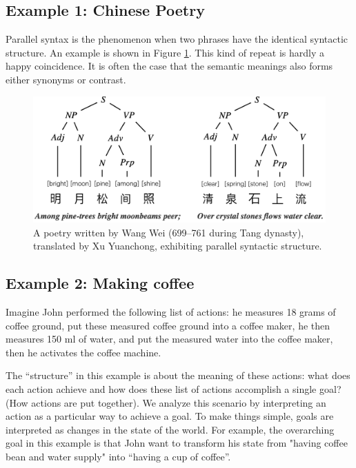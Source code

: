 \subsection{Example 1: Chinese Poetry}
Parallel syntax is the phenomenon when two phrases have the identical syntactic structure. An example is shown in Figure \ref{fig: Chinese poem}. This kind of repeat is hardly a happy coincidence. It is often the case that the semantic meanings also forms either synonyms or contrast. 
\begin{figure}
    \centering 
    \includegraphics[width=0.8\linewidth]{Chinese poem.png}
    \caption{A poetry written by Wang Wei (699–761 during Tang dynasty), translated by Xu Yuanchong, exhibiting parallel syntactic structure.} 
    \label{fig: Chinese poem}
\end{figure}

\subsection{Example 2: Making coffee}
Imagine John performed the following list of actions: he measures 18 grams of coffee ground, put these measured coffee ground into a coffee maker, he then measures 150 ml of water, and put the measured water into the coffee maker, then he activates the coffee machine. 


The ``structure'' in this example is about the meaning of these actions: what does each action achieve and how does these list of actions accomplish a single goal? (How actions are put together). 
We analyze this scenario by interpreting an action as a particular way to achieve a goal. To make things simple, goals are interpreted as changes in the state of the world. For example, the overarching goal in this example is that John want to transform his state from "having coffee bean and water supply" into ``having a cup of coffee''. 

